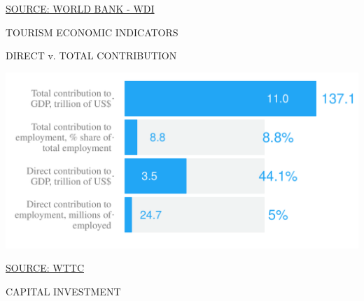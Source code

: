 \documentclass{article}\usepackage[]{graphicx}\usepackage[]{color}
\makeatletter
\def\maxwidth{ %
  \ifdim\Gin@nat@width>\linewidth
    \linewidth
  \else
    \Gin@nat@width
  \fi
}
\makeatother
\begin{document}
\begin{minipage}[c]{0.95\textwidth}
\begin{minipage}[c]{0.5\textwidth}
{}



  \hspace{4ex}\scriptsize{\href{NA}{\textcolor[HTML]{FF4023}{SOURCE: WORLD BANK - WDI}}}
  \end{minipage}
\end{minipage}

\clearpage

\begin{minipage}[c]{0.95\textwidth}
  \vspace{5ex}
  \begin{flushleft}  
    \hspace{4ex}\Large{\textcolor[HTML]{FF4023}{TOURISM ECONOMIC INDICATORS}}\hspace{2ex}\small{\textcolor[HTML]{818181}{}}
  \end{flushleft}
  \begin{minipage}[c]{0.5\textwidth}  
    \hspace{4ex}\small{\textcolor[HTML]{818181}{DIRECT v. TOTAL CONTRIBUTION}}
    \vspace{1ex}


{\centering \includegraphics[width=\maxwidth]{figure/bar2_1-1} 

}



    \hspace{4ex}\scriptsize{\href{NA}{\textcolor[HTML]{FF4023}{SOURCE: WTTC}}}
  \end{minipage}
  \begin{minipage}[c]{0.5\textwidth} 
    \hspace{4ex}\small{\textcolor[HTML]{818181}{CAPITAL INVESTMENT}}
    \vspace{1ex}



\end{minipage}
\end{minipage}
\end{document}
